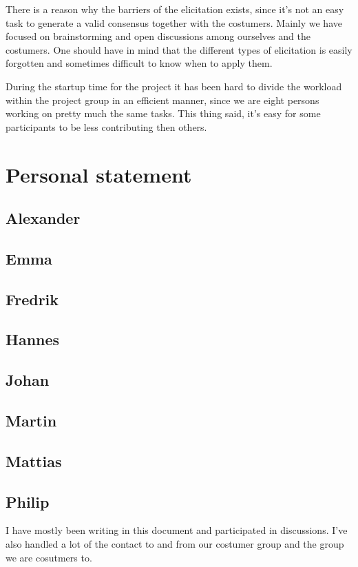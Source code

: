 \documentclass[a4paper]{article}
\begin{document}


	There is a reason why the barriers of the elicitation exists, since it's not an easy task to generate a valid consensus together with the costumers.
	Mainly we have focused on brainstorming and open discussions among ourselves and the costumers. One should have in mind that the different types of elicitation is easily forgotten and sometimes difficult to know when to apply them.
  
 	During the startup time for the project it has been hard to divide the workload within the project group in an efficient manner, since we are eight persons working on pretty much the same tasks. This thing said, it's easy for some participants to be less contributing then others.


  \section{Personal statement}
  
  \subsection{Alexander}
  \subsection{Emma}
  \subsection{Fredrik}
  \subsection{Hannes}
  \subsection{Johan}
  \subsection{Martin}
  \subsection{Mattias}
  \subsection{Philip}
  I have mostly been writing in this document and participated in discussions. 
  I've also handled a lot of the contact to and from our costumer group and the group we are cosutmers to.
\end{document}
